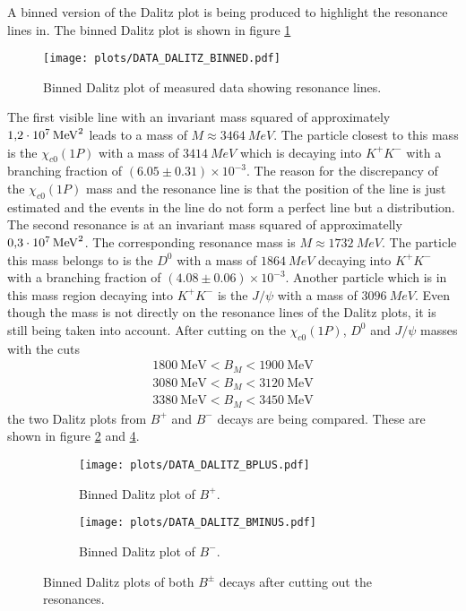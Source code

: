 A binned version of the Dalitz plot is being produced to highlight the resonance lines in.
The binned Dalitz plot is shown in figure \ref{fig:DalitzBinned}
\begin{figure}[!htb]
  \centering
  \texttt{[image: plots/DATA\_DALITZ\_BINNED.pdf]}
  \caption{Binned Dalitz plot of measured data showing resonance lines.}
  \label{fig:DalitzBinned}
\end{figure}
The first visible line with an invariant mass squared of approximately $\SI{1.2e7}{MeV\squared}$ leads to a mass of $M \approx \SI{3464}{MeV}$.
The particle closest to this mass is the $\chi_{c0}(1P)$ with a mass of $\SI{3414}{MeV}$ which is decaying into $K^+K^-$ with a branching fraction of $(6.05\pm0.31) \times 10^{-3}$\cite{pdg}.
The reason for the discrepancy of the $\chi_{c0}(1P)$ mass and the resonance line is that the position of the line is just estimated and the events in the line do not form a perfect line but a distribution.
The second resonance is at an invariant mass squared of approximatelly $\SI{0.3e7}{MeV\squared}$.
The corresponding resonance mass is $M \approx \SI{1732}{MeV}$.
The particle this mass belongs to is the $D^0$ with a mass of $\SI{1864}{MeV}$ decaying into $K^+K^-$ with a branching fraction of $(4.08\pm0.06) \times 10^{-3}$\cite{pdg}.
Another particle which is in this mass region decaying into $K^+K^-$ is the $J/\psi$ with a mass of $\SI{3096}{MeV}$.
Even though the mass is not directly on the resonance lines of the Dalitz plots, it is still being taken into account.
After cutting on the $\chi_{c0}(1P)$, $D^0$ and $J/\psi$ masses with the cuts
\begin{align*}
 \SI{1800}{\mega\electronvolt} < B_M < \SI{1900}{\mega\electronvolt}  \\
 \SI{3080}{\mega\electronvolt} < B_M < \SI{3120}{\mega\electronvolt} \\
 \SI{3380}{\mega\electronvolt} < B_M < \SI{3450}{\mega\electronvolt}
\end{align*}
the two Dalitz plots from $B^+$ and $B^-$ decays are being compared.
These are shown in figure \ref{fig:DalitzBPLUS} and \ref{fig:DalitzBMINUS}.

\begin{figure}[!htb]
\centering
\begin{subfigure}{0.49\textwidth}
  \texttt{[image: plots/DATA\_DALITZ\_BPLUS.pdf]}
  \caption{Binned Dalitz plot of $B^+$.}
  \label{fig:DalitzBPLUS}
\end{subfigure}
\begin{subfigure}{0.49\textwidth}
  \texttt{[image: plots/DATA\_DALITZ\_BMINUS.pdf]}
  \caption{Binned Dalitz plot of $B^-$.}
  \label{fig:DalitzBMINUS}
\end{subfigure}
\caption{Binned Dalitz plots of both $B^\pm$ decays after cutting out the resonances.}
\end{figure}

